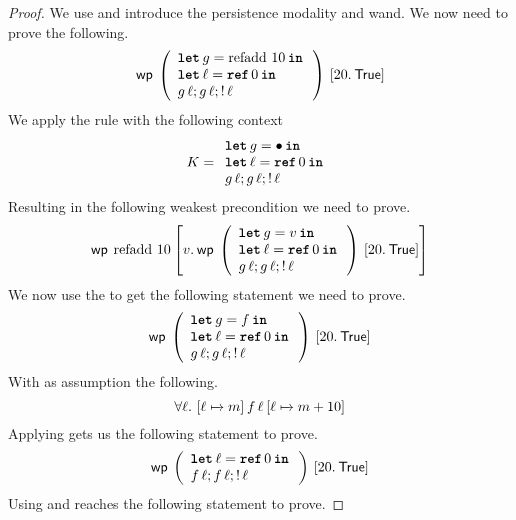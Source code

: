 \documentclass[thesis.tex]{subfiles}
\begin{document}
\begin{proof}
    We use  and introduce the persistence modality and wand. We now need to prove the following.
    \[\wpre{
            \left(
            \begin{array}{l}
                \Let g = \operatorname{refadd}\, 10 in \\
                \Let \loc = \Alloc 0 in                \\
                g\, \loc; g\, \loc; \deref \loc
            \end{array}
            \right)
        }{\Ret 20. \TRUE}\]
    We apply the  rule with the following context
    \[
        \lctx = \begin{array}{l}
            \Let g = \bullet in     \\
            \Let \loc = \Alloc 0 in \\
            g\, \loc; g\, \loc; \deref \loc
        \end{array}
    \]
    Resulting in the following weakest precondition we need to prove.
    \[
        \wpre{\operatorname{refadd}\, 10}{
            \Ret\val. \wpre{\left(\begin{array}{l}
                    \Let g = \val in        \\
                    \Let \loc = \Alloc 0 in \\
                    g\, \loc; g\, \loc; \deref \loc
                \end{array}\right)}{\Ret 20. \TRUE}
        }
    \]
    We now use the  to get the following statement we need to prove.
    \[
        \wpre{\left(\begin{array}{l}
                \Let g = f in           \\
                \Let \loc = \Alloc 0 in \\
                g\, \loc; g\, \loc; \deref \loc
            \end{array}\right)}{\Ret 20. \TRUE}
    \]
    With as assumption the following.
    \[
        \forall \loc.\ \hoare{\loc \fmapsto m}{f\, \loc}{\loc\fmapsto m + 10}
    \]
    Applying  gets us the following statement to prove.
    \[
        \wpre{\left(\begin{array}{l}
                \Let \loc = \Alloc 0 in \\
                f\, \loc; f\, \loc; \deref \loc
            \end{array}\right)}{\Ret 20. \TRUE}
    \]
    Using  and  reaches the following statement to prove.

\end{proof}
\end{document}
